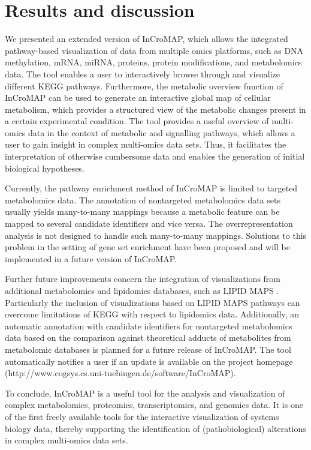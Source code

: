\documentclass[final,5p,times,twocolumn]{elsarticle}
\begin{document}
\section{Results and discussion}
We presented an extended version of InCroMAP, which allows the integrated pathway-based visualization of data from multiple omics platforms, such as DNA methylation, mRNA, miRNA, proteins, protein modifications, and metabolomics data. The tool enables a user to interactively browse through and visualize different KEGG pathways. Furthermore, the metabolic overview function of InCroMAP can be used to generate an interactive global map of cellular metabolism, which provides a structured view of the metabolic changes present in a certain experimental condition. The tool provides a useful overview of multi-omics data in the context of metabolic and signalling pathways, which allows a user to gain insight in complex multi-omics data sets. Thus, it facilitates the interpretation of otherwise cumbersome data and enables the generation of initial biological hypotheses. 

Currently, the pathway enrichment method of InCroMAP is limited to targeted metabolomics data. The annotation of nontargeted metabolomics data sets usually yields many-to-many mappings because a metabolic feature can be mapped to several candidate identifiers and vice versa. The overrepresentation analysis is not designed to handle such many-to-many mappings. Solutions to this problem in the setting of gene set enrichment have been proposed \cite{Kankainen2011} and will be implemented in a future version of InCroMAP. 

Further future improvements concern the integration of visualizations from additional metabolomics and lipidomics databases, such as LIPID MAPS \cite{Sud2007}. Particularly the inclusion of visualizations based on LIPID MAPS pathways can overcome limitations of KEGG with respect to lipidomics data. Additionally, an automatic annotation with candidate identifiers for nontargeted metabolomics data based on the comparison against theoretical adducts of metabolites from metabolomic databases is planned for a future release of InCroMAP. The tool automatically notifies a user if an update is available on the project homepage (http://www.cogsys.cs.uni-tuebingen.de/software/InCroMAP).

To conclude, InCroMAP is a useful tool for the analysis and visualization of complex metabolomics, proteomics, transcriptomics, and genomics data. It is one of the first freely available tools for the interactive visualization of systems biology data, thereby supporting the identification of (pathobiological) alterations in complex multi-omics data sets.
\end{document}
